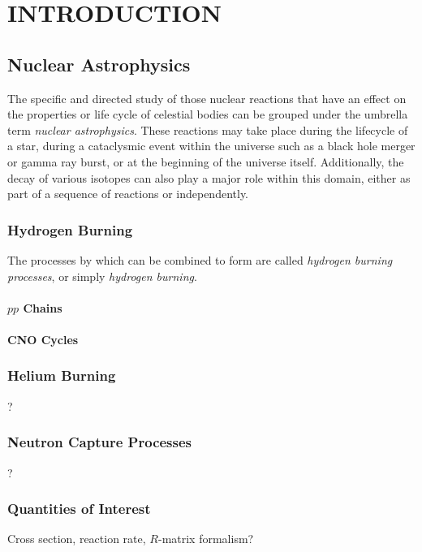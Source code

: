 \chapter{INTRODUCTION}

\section{Nuclear Astrophysics}
\label{sec:ch01-nuclear-astrophysics}

The specific and directed study of those nuclear reactions that have an effect
on the properties or life cycle of celestial bodies can be grouped under the
umbrella term \emph{nuclear astrophysics}. These reactions may take place
during the lifecycle of a star, during a cataclysmic event within the universe
such as a black hole merger or gamma ray burst, or at the beginning of the
universe itself. Additionally, the decay of various isotopes can also play a
major role within this domain, either as part of a sequence of reactions or
independently.

\subsection{Hydrogen Burning}

The processes by which  can be combined to form  are
called \emph{hydrogen burning processes}, or simply \emph{hydrogen burning}.

\subsubsection{$pp$ Chains}
\subsubsection{CNO Cycles}
\subsection{Helium Burning}
?
\subsection{Neutron Capture Processes}
?
\subsection{Quantities of Interest}
Cross section, reaction rate, $R$-matrix formalism?


